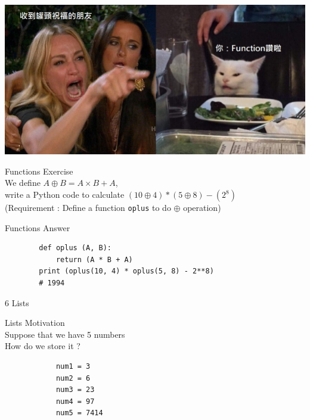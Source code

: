 \documentclass{beamer}
\begin{document}
    \begin{frame}
        \begin{center}
            \includegraphics[scale=0.3]{Cat_and_women.jpg}
        \end{center}
    \end{frame}
    
    \begin{frame}{Functions}
        \color{blue} \Large Exercise \\
        \color{black} \normalsize \vskip 5pt
        We define $A \oplus B = A \times B + A$, \\
        write a Python code to calculate $ (10 \oplus 4) * (5 \oplus 8) - (2^8) $ \\
        (Requirement : Define a function \texttt{oplus} to do $\oplus$ operation)
    \end{frame}
    
    \begin{frame}[fragile]{Functions}
        \color{blue} \Large Answer \\
        \color{black} \normalsize \vskip 5pt
        \begin{verbatim}
        def oplus (A, B):
            return (A * B + A)
        print (oplus(10, 4) * oplus(5, 8) - 2**8)
        # 1994
        \end{verbatim}
    \end{frame} 
    
    \begin{frame}[plain, c]
    \begin{center}
        \color{blue} \LARGE 6 Lists
    \end{center}
    \end{frame}

    \begin{frame}[fragile]{Lists}
        \color{blue} \Large Motivation \\
        \color{black} \normalsize \vskip 5pt
        Suppose that we have 5 numbers \\
        How do we store it ? \\
        \begin{verbatim}
            num1 = 3
            num2 = 6
            num3 = 23
            num4 = 97
            num5 = 7414
        \end{verbatim}
    \end{frame}
\end{document}
